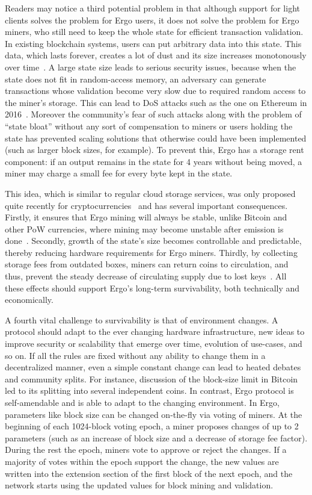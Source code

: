 Readers may notice a third potential problem in that although support for light clients solves the problem for Ergo users, it does not solve the problem for Ergo miners, who still need to keep the whole state for efficient transaction validation.
In existing blockchain systems, users can put arbitrary data into this state. This data, which lasts forever, creates a lot of dust and its size increases monotonously over time~\cite{perez2019another}.
A large state size leads to serious security issues, because when the state does not fit in random-access memory, an adversary can generate transactions whose validation become very slow due to required random access to the miner's storage. This can lead to DoS attacks such as the one on Ethereum in 2016~\cite{ethDos2016}.
Moreover the community's fear of such attacks along with the problem of ``state bloat'' without any sort of compensation to miners or users holding the state has prevented scaling solutions that otherwise
could have been implemented (such as larger block sizes, for example).
To prevent this, Ergo has a storage rent component: if an
output remains in the state for 4 years without being moved, a miner may charge a small fee for every
byte kept in the state.

This idea, which is similar to regular cloud storage services, was only proposed quite recently for cryptocurrencies~\cite{chepurnoy2017space} and has several important consequences.
Firstly, it ensures that Ergo mining will always be stable, unlike Bitcoin and other PoW currencies, where mining may become unstable after emission is done~\cite{carlsten2016instability}.
Secondly, growth of the state's size becomes controllable and predictable, thereby reducing hardware requirements for Ergo miners.
Thirdly, by collecting storage fees from outdated boxes, miners can return coins to circulation, and thus, prevent the steady decrease of circulating supply due to lost keys~\cite{wsj2018}. 
All these effects should support Ergo's long-term survivability, both technically and economically.

A fourth vital challenge to survivability is that of environment changes. A protocol should  adapt to the ever changing hardware infrastructure, new ideas to improve security or
scalability that emerge over time, evolution of use-cases, and so on.
If all the rules are fixed without any ability to change them in a decentralized manner, even
a simple constant change can lead to heated debates and community splits. For instance,  discussion of the block-size limit in Bitcoin led to its splitting into several independent coins.
In contrast, Ergo protocol is self-amendable and is able to adapt to the changing environment.
In Ergo, parameters like block size can be changed on-the-fly via voting of miners.
At the beginning of each 1024-block voting epoch, a miner proposes changes of up to 2 parameters (such as an increase of block size and a decrease of storage fee factor). During the rest the epoch, miners vote to approve or reject the changes.
If a majority of votes within the epoch support the change, the new values are written into the extension section of the first block of the next epoch, and
the network starts using the updated values for block mining and validation.

